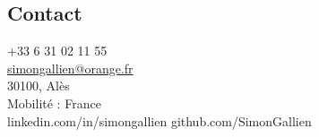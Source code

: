 \documentclass[a4paper,12pt]{article}
\begin{document}
\begin{paracol}{2}

\begin{leftcolumn}
  \begin{minipage}[t][\dimexpr\textheight - 9em\relax][t]{\dimexpr\linewidth}
    \hspace*{2.5em}
    \parbox{\dimexpr\linewidth-1.5em\relax}{

    \section*{Contact}
    \small
    +33 6 31 02 11 55\\
    \href{mailto:simongallien@orange.fr}{simongallien@orange.fr}\\
    30100, Alès\\
    Mobilité : France\\
    linkedin.com/in/simongallien
    github.com/SimonGallien

    \vspace{1em}
}
\end{minipage}
\end{leftcolumn}
\end{paracol}
\end{document}
